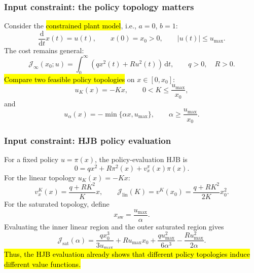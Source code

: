 \begin{frame}
	\frametitle{Input constraint: the policy topology matters}
	Consider the \hl{constrained plant model}, i.e., $a=0$, $b=1$:
	\begin{equation*}
		\frac{\mathrm{d}}{\mathrm{d}t}x(t)=u(t),
		\qquad x(0)=x_0>0,
		\qquad |u(t)|\leq u_{\max} .
	\end{equation*}\pause%
	The cost remains general:
	\begin{equation*}
		\mathcal{J}_\infty(x_0;u)=
		\int_0^\infty \left(q x^2(t)+R u^2(t)\right)\,\mathrm{d}t,
		\qquad q>0,
		\quad R>0 .
	\end{equation*}\pause%
	\hl{Compare two feasible policy topologies} on $x\in[0,x_0]$:
	\begin{equation*}
		u_K(x)=-Kx,
		\qquad
		0<K\leq\frac{u_{\max}}{x_0},
	\end{equation*}\pause%
	and
	\begin{equation*}
		u_\alpha(x)=-\min\{\alpha x,u_{\max}\},
		\qquad
		\alpha\geq\frac{u_{\max}}{x_0} .
	\end{equation*}
\end{frame}



\begin{frame}
	\frametitle{Input constraint: HJB policy evaluation}
	For a fixed policy $u=\pi(x)$, the policy-evaluation HJB is
	\begin{equation*}
		0=q x^2+R\pi^2(x)+v_x^\pi(x)\pi(x).
	\end{equation*}\pause%
	For the linear topology $u_K(x)=-Kx$:
	\begin{equation*}
		v_x^K(x)=\frac{q+RK^2}{K}x,
		\qquad
		\mathcal{J}_{\mathrm{lin}}(K)=v^K(x_0)
		=\frac{q+RK^2}{2K}x_0^2 .
	\end{equation*}\pause%
	For the saturated topology, define
	\begin{equation*}
		x_{\mathrm{sw}}=\frac{u_{\max}}{\alpha} .
	\end{equation*}\pause%
	Evaluating the inner linear region and the outer saturated region gives
	\begin{equation*}
		\mathcal{J}_{\mathrm{sat}}(\alpha)
		=\frac{q x_0^3}{3u_{\max}}+Ru_{\max}x_0
		+\frac{q u_{\max}^2}{6\alpha^3}
		-\frac{R u_{\max}^2}{2\alpha} .
	\end{equation*}\pause%
	\hl{Thus, the HJB evaluation already shows that different policy topologies induce different value functions.}
\end{frame}


